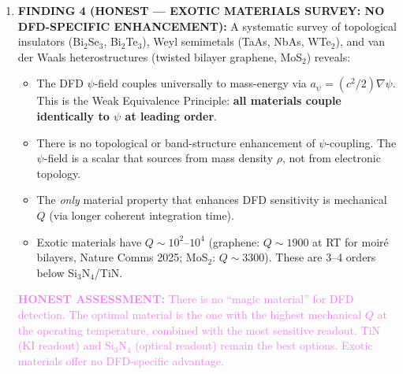 \documentclass[11pt]{article}
\theoremstyle{remark}
\newcommand{\honest}[1]{\textcolor{violet}{\textbf{HONEST ASSESSMENT:} #1}}
\begin{document}
\begin{tcolorbox}[colback=blue!5!white, colframe=blue!50!black,
  title=\textbf{W4i19 TOP 5 FINDINGS --- Ranked by Programme Impact}]
\begin{enumerate}
\item \textbf{FINDING 4 (HONEST --- EXOTIC MATERIALS SURVEY: NO DFD-SPECIFIC
ENHANCEMENT):}
A systematic survey of topological insulators (Bi$_2$Se$_3$,
Bi$_2$Te$_3$), Weyl semimetals (TaAs, NbAs, WTe$_2$), and van der
Waals heterostructures (twisted bilayer graphene, MoS$_2$) reveals:
\begin{itemize}[nosep]
  \item The DFD $\psi$-field couples universally to mass-energy via
    $a_\psi = (c^2/2)\nabla\psi$. This is the Weak Equivalence
    Principle: \textbf{all materials couple identically to $\psi$
    at leading order}.
  \item There is no topological or band-structure enhancement of
    $\psi$-coupling. The $\psi$-field is a scalar that sources from
    mass density $\rho$, not from electronic topology.
  \item The \emph{only} material property that enhances DFD sensitivity
    is mechanical $Q$ (via longer coherent integration time).
  \item Exotic materials have $Q \sim 10^2$--$10^4$ (graphene: $Q \sim
    1900$ at RT for moir\'e bilayers, Nature Comms 2025; MoS$_2$:
    $Q \sim 3300$). These are 3--4 orders below Si$_3$N$_4$/TiN.
\end{itemize}
\honest{There is no ``magic material'' for DFD detection. The optimal
material is the one with the highest mechanical $Q$ at the operating
temperature, combined with the most sensitive readout. TiN (KI readout)
and Si$_3$N$_4$ (optical readout) remain the best options. Exotic
materials offer no DFD-specific advantage.}


\end{enumerate}
\end{tcolorbox}
\end{document}
